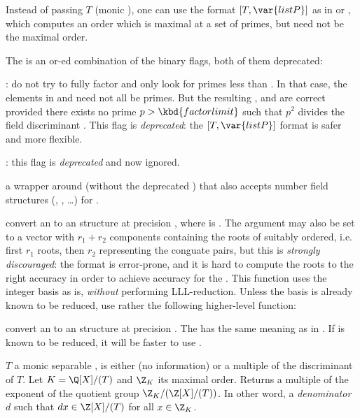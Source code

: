Instead of passing $T$ (monic ), one can use the format
$[T,\var{listP}]$ as in  or , which computes an
order which is maximal at a set of primes, but need not be the maximal order.

The  is an or-ed combination of the binary flags, both of them
deprecated:

: do not try to fully factor  and only look for
primes less than . In that case, the elements in 
and  need not all be primes. But the resulting ,
 and  are correct provided there exists no prime $p >
\kbd{factorlimit}$ such that $p^2$ divides the field discriminant .
This flag is \emph{deprecated}: the $[T,\var{listP}]$ format is safer and more
flexible.

: this flag is \emph{deprecated} and now ignored.

 a wrapper around
 (without the deprecated ) that also accepts number
field structures (, , \dots) for .

 convert an
 to an  structure at precision ,
where  is . The argument  may also be set to a
vector with $r_1 + r_2$ components containing the roots of 
suitably ordered, i.e. first $r_1$  roots, then $r_2$ 
representing the conguate pairs, but this is \emph{strongly discouraged}: the
format is error-prone, and it is hard to compute the roots to the right
accuracy in order to achieve  accuracy for the . This
function uses the integer basis  as is, \emph{without}
performing LLL-reduction. Unless the basis is already known to be reduced,
use rather the following higher-level function:

 convert
an  to an  structure at precision .
The  has the same meaning as in . If
 is known to be reduced, it will be faster to
use .

 $T$ a monic separable ,
 is either  (no information) or a multiple of the
discriminant of $T$. Let $K = \Q[X]/(T)$ and $\Z_K$ its maximal order.
Returns a multiple of the exponent of the quotient group $\Z_K/(\Z[X]/(T))$.
In other word, a \emph{denominator} $d$ such that $d x\in\Z[X]/(T)$ for all
$x\in\Z_K$.

